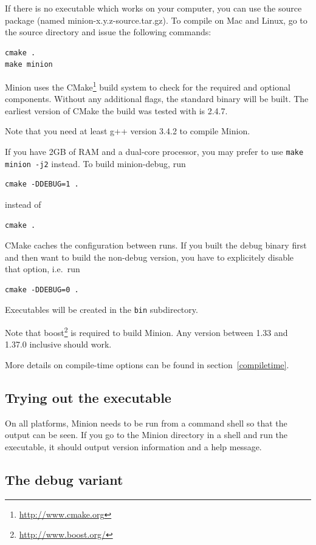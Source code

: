\documentclass[oneside]{book}
\begin{document}
If there is no executable which works on your computer, you can use
the source package (named minion-x.y.z-source.tar.gz). To compile on
Mac and Linux, go to the source directory and issue the following
commands:

\begin{verbatim}
cmake .
make minion
\end{verbatim}

Minion uses the CMake\footnote{\url{http://www.cmake.org}} build system to check
for the required and optional components. Without any additional flags, the
standard binary will be built. The earliest version of CMake the build was
tested with is 2.4.7.

Note that you need at least g++ version 3.4.2 to compile Minion.

If you have 2GB of RAM and a dual-core processor, you may prefer to
use \texttt{make minion -j2} instead. To build minion-debug, run
\begin{verbatim}
cmake -DDEBUG=1 .
\end{verbatim}
instead of
\begin{verbatim}
cmake .
\end{verbatim}
CMake caches the configuration between runs. If you built the debug binary first
and then want to build the non-debug version, you have to explicitely disable
that option, i.e.\ run
\begin{verbatim}
cmake -DDEBUG=0 .
\end{verbatim}

Executables will be created in the \texttt{bin} subdirectory.

Note that boost\footnote{\url{http://www.boost.org/}} is required to build
Minion. Any version between 1.33 and 1.37.0 inclusive should work.

\medskip

More details on compile-time options can be found in section~\ref{compiletime}.

\subsection{Trying out the executable}

On all platforms, Minion needs to be run from a command shell so that
the output can be seen. If you go to the Minion directory in a shell
and run the executable, it should output version information and a
help message. 


\subsection{The debug variant}
\end{document}
